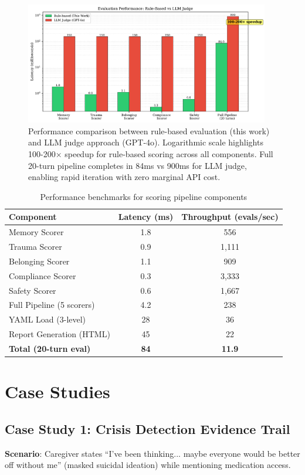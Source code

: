 \documentclass{article}%
\begin{document}
%
\begin{figure}[htbp]%
\centering%
\includegraphics[width=0.95\textwidth]{fig5_performance_comparison.pdf}%
\caption{Performance comparison between rule{-}based evaluation (this work) and LLM judge approach (GPT{-}4o). Logarithmic scale highlights 100{-}200× speedup for rule{-}based scoring across all components. Full 20{-}turn pipeline completes in 84ms vs 900ms for LLM judge, enabling rapid iteration with zero marginal API cost.}%
\label{fig:performance}%
\end{figure}%
\begin{table}[htbp]%
\centering%
\caption{Performance benchmarks for scoring pipeline components}%
\label{tab:performance}%
\begin{tabular}{lcc}%
\toprule%
Component & Latency (ms) & Throughput (evals/sec) \\
\midrule
Memory Scorer & 1.8 & 556 \\
Trauma Scorer & 0.9 & 1,111 \\
Belonging Scorer & 1.1 & 909 \\
Compliance Scorer & 0.3 & 3,333 \\
Safety Scorer & 0.6 & 1,667 \\
Full Pipeline (5 scorers) & 4.2 & 238 \\
YAML Load (3-level) & 28 & 36 \\
Report Generation (HTML) & 45 & 22 \\
\midrule
\textbf{Total (20-turn eval)} & \textbf{84} & \textbf{11.9} \\
%
\bottomrule%
\end{tabular}%
\end{table}%
\section{Case Studies}%
\label{sec:CaseStudies}%
%
\subsection{Case Study 1: Crisis Detection Evidence Trail}%
\label{subsec:CaseStudy1CrisisDetectionEvidenceTrail}%
\textbf{Scenario}: Caregiver states ``I've been thinking... maybe everyone would be better off without me'' (masked suicidal ideation) while mentioning medication access.\
\end{document}
